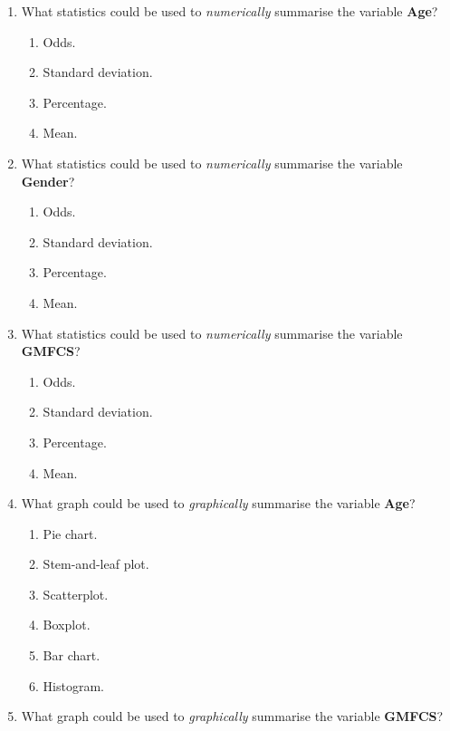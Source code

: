 \documentclass[
  11pt,
  a4paper,
  krantz2]{krantz}
\providecommand{\tightlist}{%
  \setlength{\itemsep}{0pt}\setlength{\parskip}{0pt}}
\begin{document}
\pagebreak

\begin{enumerate}
\def\labelenumi{\arabic{enumi}.}
\setcounter{enumi}{3}
\tightlist
\item
  What statistics could be used to \emph{numerically} summarise the variable \textbf{Age}?

  \begin{enumerate}
  \def\labelenumii{\alph{enumii}.}
  \tightlist
  \item
    Odds.
  \item
    Standard deviation.
  \item
    Percentage.
  \item
    Mean.
  \end{enumerate}
\item
  What statistics could be used to \emph{numerically} summarise the variable \textbf{Gender}?

  \begin{enumerate}
  \def\labelenumii{\alph{enumii}.}
  \tightlist
  \item
    Odds.
  \item
    Standard deviation.
  \item
    Percentage.
  \item
    Mean.
  \end{enumerate}
\item
  What statistics could be used to \emph{numerically} summarise the variable \textbf{GMFCS}?

  \begin{enumerate}
  \def\labelenumii{\alph{enumii}.}
  \tightlist
  \item
    Odds.
  \item
    Standard deviation.
  \item
    Percentage.
  \item
    Mean.
  \end{enumerate}
\item
  What graph could be used to \emph{graphically} summarise the variable \textbf{Age}?

  \begin{enumerate}
  \def\labelenumii{\alph{enumii}.}
  \tightlist
  \item
    Pie chart.
  \item
    Stem-and-leaf plot.
  \item
    Scatterplot.
  \item
    Boxplot.
  \item
    Bar chart.
  \item
    Histogram.
  \end{enumerate}
\item
  What graph could be used to \emph{graphically} summarise the variable \textbf{GMFCS}?


\end{enumerate}
\end{document}

